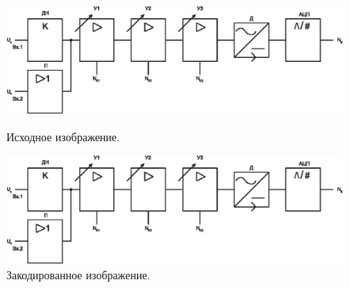 \begin{figure}[H]
\begin{center}
  \captionsetup{width=60mm}%
\begin{minipage}[h]{0.4\linewidth}
\includegraphics[width=1\linewidth]{./about/func_in}
\caption{Исходное изображение.} %
\label{ris:experimoriginal} %
\end{minipage}
\hfill
\begin{minipage}[h]{0.4\linewidth}
\includegraphics[width=1\linewidth]{./about/func_in}
\caption{Закодированное изображение.}
\label{ris:experimcoded}
\end{minipage}
\end{center}
\end{figure}



